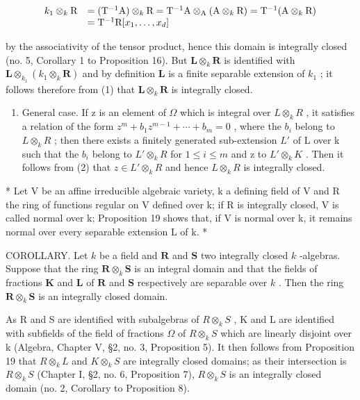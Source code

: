 \[
\begin{array}{r l} k _ {1} \otimes_ {k} \mathrm{R} & = (\mathrm{T} ^ {- 1} \mathrm{A}) \otimes_ {k} \mathrm{R} = \mathrm{T} ^ {- 1} \mathrm{A} \otimes_ {\mathrm{A}} (\mathrm{A} \otimes_ {k} \mathrm{R}) = \mathrm{T} ^ {- 1} (\mathrm{A} \otimes_ {k} \mathrm{R}) \\ & = \mathrm{T} ^ {- 1} \mathrm{R} [ x _ {1}, \dots , x _ {d} ] \end{array}
\]

by the associativity of the tensor product, hence this domain is integrally closed (no. 5, Corollary 1 to Proposition 16). But \(\mathbf{L} \otimes_k \mathbf{R}\) is identified with \(\mathbf{L} \otimes_{k_1} (k_1 \otimes_k \mathbf{R})\) and by definition \(\mathbf{L}\) is a finite separable extension of \(k_1\) ; it follows therefore from (1) that \(\mathbf{L} \otimes_k \mathbf{R}\) is integrally closed.

\begin{enumerate}
\def\labelenumi{(\arabic{enumi})}
\setcounter{enumi}{2}
\tightlist
\item
  General case. If z is an element of \(\Omega\) which is integral over \(L \otimes_{k} R\) , it satisfies a relation of the form \(z^{m} + b_{1}z^{m-1} + \cdots + b_{m} = 0\) , where the \(b_{i}\) belong to \(L \otimes_{k} R\) ; then there exists a finitely generated sub-extension \(L'\) of L over k such that the \(b_{i}\) belong to \(L' \otimes_{k} R\) for \(1 \leqslant i \leqslant m\) and z to \(L' \otimes_{k} K\) . Then it follows from (2) that \(z \in L' \otimes_{k} R\) and hence \(L \otimes_{k} R\) is integrally closed.
\end{enumerate}

* Let V be an affine irreducible algebraic variety, k a defining field of V and R the ring of functions regular on V defined over k; if R is integrally closed, V is called normal over k; Proposition 19 shows that, if V is normal over k, it remains normal over every separable extension L of k. *

COROLLARY. Let \(k\) be a field and \(\mathbf{R}\) and \(\mathbf{S}\) two integrally closed \(k\) -algebras. Suppose that the ring \(\mathbf{R} \otimes_k \mathbf{S}\) is an integral domain and that the fields of fractions \(\mathbf{K}\) and \(\mathbf{L}\) of \(\mathbf{R}\) and \(\mathbf{S}\) respectively are separable over \(k\) . Then the ring \(\mathbf{R} \otimes_k \mathbf{S}\) is an integrally closed domain.

As R and S are identified with subalgebras of \(R \otimes_{k} S\) , K and L are identified with subfields of the field of fractions \(\Omega\) of \(R \otimes_{k} S\) which are linearly disjoint over k (Algebra, Chapter V, §2, no. 3, Proposition 5). It then follows from Proposition 19 that \(R \otimes_{k} L\) and \(K \otimes_{k} S\) are integrally closed domains; as their intersection is \(R \otimes_{k} S\) (Chapter I, §2, no. 6, Proposition 7), \(R \otimes_{k} S\) is an integrally closed domain (no. 2, Corollary to Proposition 8).

